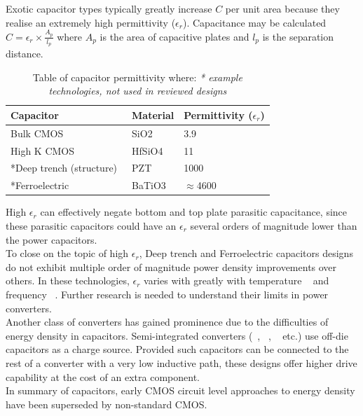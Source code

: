 \documentclass[letterpaper,twocolumn,10pt]{article}
\begin{document}
Exotic capacitor types typically greatly increase $C$ per unit area because they realise an extremely high permittivity ($\epsilon_r$). Capacitance may be calculated $C = \epsilon_r \times \frac{A_p}{l_p}$ where $A_p$ is the area of capacitive plates and $l_p$ is the separation distance. 
\begin{table}
    \begin{tabular}{|l|l|l|}
    \hline
    Capacitor               & Material & Permittivity ($\epsilon_r$) \\ \hline
    Bulk CMOS~\cite{Robertson2004}               & SiO2     & 3.9          \\ \hline
    High K CMOS~\cite{Robertson2004}             & HfSiO4   & 11           \\ \hline
    *Deep trench (structure)~\cite{Johari2009} & PZT      & 1000         \\ \hline
    *Ferroelectric~\cite{Lee2004}			& BaTiO3      & $\approx$4600         \\ \hline    
    \end{tabular}
    \caption{Table of capacitor permittivity where: \textit{* example technologies, not used in reviewed designs}}
    \label{PermittivityTable}
\end{table}
High $\epsilon_r$ can effectively negate bottom and top plate parasitic capacitance, since these parasitic capacitors could have an $\epsilon_r$ several orders of magnitude lower than the power capacitors.\\ 
To close on the topic of high $\epsilon_r$, Deep trench and Ferroelectric capacitors designs do not exhibit multiple order of magnitude power density improvements over others. In these technologies, $\epsilon_r$ varies with greatly with temperature ~\cite{Lee2004} and frequency ~\cite{Callister2012}. %
Further research is needed to understand their limits in power converters.\\
Another class of converters has gained prominence due to the difficulties of energy density in capacitors. Semi-integrated converters (~\cite{Pilawa2012}, ~\cite{Bathily2012}, ~\cite{Ng2012} etc.) use off-die capacitors as a charge source. Provided such capacitors can be connected to the rest of a converter with a very low inductive path, these designs offer higher drive capability at the cost of an extra component.\\
\indent In summary of capacitors, early CMOS circuit level approaches to energy density have been superseded by non-standard CMOS. %
\end{document}
